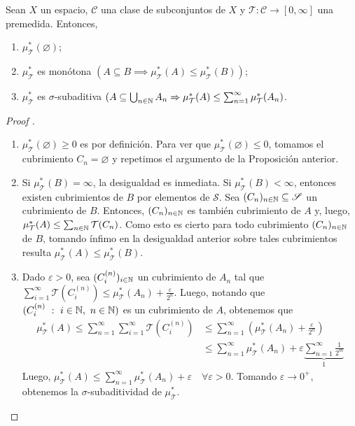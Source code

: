 \begin{theorem}
	Sean $X$ un espacio, $\mathscr{C}$ una clase de subconjuntos de $X$ y $\mathcal{T}:\mathscr{C} \to [0,\infty]$ una premedida. Entonces,
	\begin{enumerate}
		\item $\mu_{\mathcal{T}}^{*}(\varnothing)$;

		\item $\mu_{\mathcal{T}}^{*}$ es monótona $(A \subseteq B \implies \mu_{\mathcal{T}}^{*}(A)\leq\mu_{\mathcal{T}}^{*}(B))$;

		\item $\mu_{\mathcal{T}}^{*}$ es $\sigma$-subaditiva $(A\subseteq\bigcup_{n\in\mathbb{N}}A_n \Rightarrow \mu_{\mathcal{T}}^{*}(A) \leq \sum_{n=1}^{\infty} \mu_{\mathcal{T}}^{*}(A_n)$.
	\end{enumerate}
\end{theorem}
\begin{proof}[Proof ]
	\begin{enumerate}
		\item $\mu_{\mathcal{T}}^{*}(\varnothing)\geq 0$ es por definición. Para ver que $\mu_{\mathcal{T}}^{*}(\varnothing)\leq 0$, tomamos el cubrimiento $C_n = \varnothing$ y repetimos el argumento de la Proposición anterior.
		
		\item Si $\mu_{\mathcal{T}}^{*}(B)=\infty$, la desigualdad es inmediata. Si $\mu_{\mathcal{T}}^{*}(B)<\infty$, entonces existen cubrimientos de $B$ por elementos de $\mathscr{S}$. Sea $(C_n)_{n\in\mathbb{N}}\subseteq\mathscr{S}$ un cubrimiento de $B$. Entonces, $(C_n)_{n\in\mathbb{N}}$ es también cubrimiento de $A$ y, luego, $\mu_{\mathcal{T}}^{*}(A)\leq \sum_{n\in\mathbb{N}} \mathcal{T}(C_n)$. Como esto es cierto para todo cubrimiento $(C_n)_{n\in\mathbb{N}}$ de $B$, tomando ínfimo en la desigualdad anterior sobre tales cubrimientos resulta $\mu_{\mathcal{T}}^{*}(A) \leq \mu_{\mathcal{T}}^{*}(B)$.

		\item Dado $\varepsilon>0$, sea $(C_{i}^{(n)})_{i\in\mathbb{N}}$ un cubrimiento de $A_n$ tal que $\sum_{i=1}^{\infty} \mathcal{T}(C_{i}^{(n)}) \leq \mu_{\mathcal{T}}^{*}(A_n) + \frac{\varepsilon}{2^n}$. Luego, notando que $(C_{i}^{(n)}\ : \ i\in\N,\ n\in\N)$ es un cubrimiento de $A$, obtenemos que
		\begin{align*}
			\mu_{\mathcal{T}}^{*}(A) \leq \sum_{n=1}^{\infty} \sum_{i=1}^{\infty} \mathcal{T}(C_{i}^{(n)}) & \leq \sum_{n=1}^{\infty} \left(\mu_{\mathcal{T}}^{*}(A_n) + \frac{\varepsilon}{2^n} \right) \\
			& \leq \sum_{n=1}^{\infty} \mu_{\mathcal{T}}^{*}(A_n) + \varepsilon \underbrace{\sum_{n=1}^{\infty} \frac{1}{2^m}}_{1}
		\end{align*}
		Luego, $\mu_{\mathcal{T}}^{*}(A) \leq \sum_{n=1}^{\infty} \mu_{\mathcal{T}}^{*}(A_n) + \varepsilon \quad \forall \varepsilon>0$. Tomando $\varepsilon \to 0^+$, obtenemos la $\sigma$-subaditividad de $\mu_{\mathcal{T}}^{*}$.
	\end{enumerate}
\end{proof}

